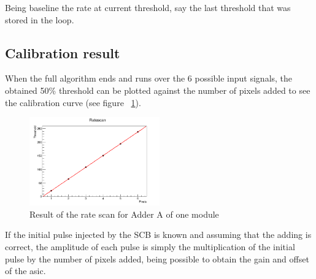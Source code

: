 \documentclass[a4paper,10pt]{book}
\begin{document}
Being baseline the rate at current threshold, say the last threshold that was stored in the loop. 

\subsection{Calibration result}

When the full algorithm ends and runs over the 6 possible input signals, the obtained 50\% threshold can be plotted against the number of pixels 
added to see the calibration curve (see figure ~\ref{fig:calibcurve}).

\begin{figure}
\centering
 \includegraphics[width=0.5\textwidth]{./calibcurve.png}
  \caption{Result of the rate scan for Adder A of one module}
    \label{fig:calibcurve}
\end{figure}

If the initial pulse injected by the SCB is known and assuming that the adding is correct, the amplitude of each pulse is simply the multiplication of the initial pulse by the number
of pixels added, being possible to obtain the gain and offset of the asic. 
\end{document}
